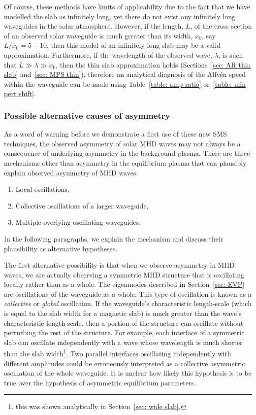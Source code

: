 Of course, these methods have limits of applicability due to the fact that we have modelled the slab as infinitely long, yet there do not exist any infinitely long waveguides in the solar atmosphere. However, if the length, $L$, of the cross section of an observed solar waveguide is much greater than its width, $x_0$, say $L/x_0 = 5-10$, then this model of an infinitely long slab may be a valid approximation. Furthermore, if the wavelength of the observed wave, $\lambda$, is such that $L \gg \lambda \gg x_0$, then the thin slab approximation holds (Sections~\ref{sec: AR thin slab} and~\ref{sec: MPS thin}), therefore an analytical diagnosis of the Alfv\'{e}n speed within the waveguide can be made using Table~\ref{table: amp ratio} or~\ref{table: min pert shift}.


\subsubsection{Possible alternative causes of asymmetry}

As a word of warning before we demonstrate a first use of these new SMS techniques, the observed asymmetry of solar MHD waves may not always be a consequence of underlying asymmetry in the background plasma. There are three mechanisms other than asymmetry in the equilibrium plasma that can plausibly explain observed asymmetry of MHD waves:
\begin{enumerate}
	\item Local oscillations,
	\item Collective oscillations of a larger waveguide,
	\item Multiple overlying oscillating waveguides.
\end{enumerate}
In the following paragraphs, we explain the mechanism and discuss their plausibility as alternative hypotheses.

The first alternative possibility is that when we observe asymmetry in MHD waves, we are actually observing a symmetric MHD structure that is oscillating locally rather than as a whole. The eigenmodes described in Section~\ref{sec: EVP} are oscillations of the waveguide as a whole. This type of oscillation is known as a \textit{collective} or \textit{global} oscillation. If the waveguide's characteristic length-scale (which is equal to the slab width for a magnetic slab) is much greater than the wave's characteristic length-scale, then a portion of the structure can oscillate without perturbing the rest of the structure. For example, each interface of a symmetric slab can oscillate independently with a wave whose wavelength is much shorter than the slab width\footnote{this was shown analytically in Section~\ref{sec: wide slab}.}. Two parallel interfaces oscillating independently with different amplitudes could be erroneously interpreted as a collective asymmetric oscillation of the whole waveguide. It is unclear how likely this hypothesis is to be true over the hypothesis of asymmetric equilibrium parameters.

